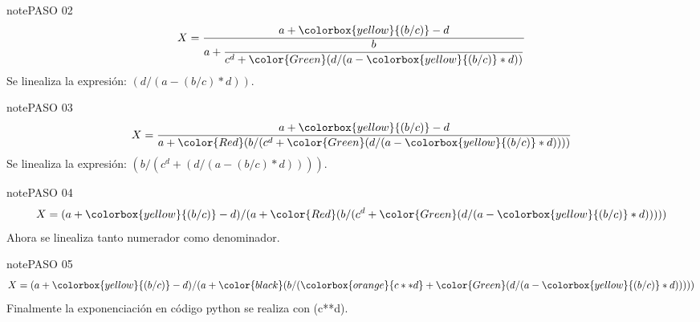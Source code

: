 \documentclass[letterpaper,10pt,spanish]{sphinxmanual}
\begin{document}
\begin{sphinxadmonition}{note}{PASO 02}
\begin{equation}\label{equation:1_guias/10programacion/G1025:1_guias/10programacion/G1025:2}
\begin{split}X = \frac{a+\colorbox{yellow}{(b/c)}-d}{a+\dfrac{b}{c^{d}+{\color{Green} (d/(a-\colorbox{yellow}{(b/c)}*d))}}}\end{split}
\end{equation}
\sphinxAtStartPar
Se linealiza la expresión: \((d/(a-(b/c) * d))\).
\end{sphinxadmonition}

\begin{sphinxadmonition}{note}{PASO 03}
\begin{equation}\label{equation:1_guias/10programacion/G1025:1_guias/10programacion/G1025:3}
\begin{split}X = \frac{a+\colorbox{yellow}{(b/c)}-d}{a+{\color{Red} ({b}/({c^{d}+{\color{Green} (d/(a-\colorbox{yellow}{(b/c)}*d))}}))}}\end{split}
\end{equation}
\sphinxAtStartPar
Se linealiza la expresión: \((b/(c^d+(d/(a-(b/c)*d))))\).
\end{sphinxadmonition}

\begin{sphinxadmonition}{note}{PASO 04}
\begin{equation}\label{equation:1_guias/10programacion/G1025:1_guias/10programacion/G1025:4}
\begin{split}X = (a+\colorbox{yellow}{(b/c)}-d)/(a+{\color{Red} ({b}/({c^{d}+{\color{Green} (d/(a-\colorbox{yellow}{(b/c)}*d))}}))})\end{split}
\end{equation}
\sphinxAtStartPar
Ahora se linealiza tanto numerador como denominador.
\end{sphinxadmonition}

\begin{sphinxadmonition}{note}{PASO 05}
\begin{equation}\label{equation:1_guias/10programacion/G1025:1_guias/10programacion/G1025:5}
\begin{split}X = (a+\colorbox{yellow}{(b/c)}-d)/(a+{\color{black} ({b}/(\colorbox{orange}{c**{d}}+{\color{Green} (d/(a-\colorbox{yellow}{(b/c)}*d))}))})\end{split}
\end{equation}
\sphinxAtStartPar
Finalmente la exponenciación en código python se realiza con (c**d).
\end{sphinxadmonition}
\end{document}
